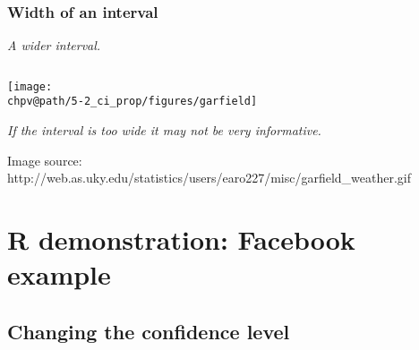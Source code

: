 \documentclass[t,compress,mathserif]{beamer}
\makeatletter
\newcommand{\soln}[1]{\textit{#1}}
\def\chpv@path{../../Chp 5}
\makeatother
\begin{document}
\begin{frame}
\frametitle{Width of an interval}


\pause

\soln{A wider interval.}

$\:$ \\


\begin{center}
\texttt{[image: \\chpv@path/5-2\_ci\_prop/figures/garfield]}
\end{center}


\soln{If the interval is too wide it may not be very informative.}

{\scriptsize Image source: http://web.as.uky.edu/statistics/users/earo227/misc/garfield\_weather.gif}

\end{frame}


\section{R demonstration: Facebook example}


\subsection{Changing the confidence level}

\end{document}

